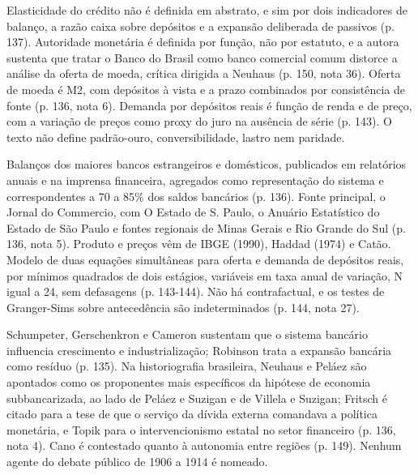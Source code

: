 


Elasticidade do crédito não é definida em abstrato, e sim por dois indicadores de balanço, a razão caixa sobre depósitos e a expansão deliberada de passivos (p. 137). Autoridade monetária é definida por função, não por estatuto, e a autora sustenta que tratar o Banco do Brasil como banco comercial comum distorce a análise da oferta de moeda, crítica dirigida a Neuhaus (p. 150, nota 36). Oferta de moeda é M2, com depósitos à vista e a prazo combinados por consistência de fonte (p. 136, nota 6). Demanda por depósitos reais é função de renda e de preço, com a variação de preços como proxy do juro na ausência de série (p. 143). O texto não define padrão-ouro, conversibilidade, lastro nem paridade.


Balanços dos maiores bancos estrangeiros e domésticos, publicados em relatórios anuais e na imprensa financeira, agregados como representação do sistema e correspondentes a 70 a 85\% dos saldos bancários (p. 136). Fonte principal, o Jornal do Commercio, com O Estado de S. Paulo, o Anuário Estatístico do Estado de São Paulo e fontes regionais de Minas Gerais e Rio Grande do Sul (p. 136, nota 5). Produto e preços vêm de IBGE (1990), Haddad (1974) e Catão. Modelo de duas equações simultâneas para oferta e demanda de depósitos reais, por mínimos quadrados de dois estágios, variáveis em taxa anual de variação, N igual a 24, sem defasagens (p. 143-144). Não há contrafactual, e os testes de Granger-Sims sobre antecedência são indeterminados (p. 144, nota 27).


Schumpeter, Gerschenkron e Cameron sustentam que o sistema bancário influencia crescimento e industrialização; Robinson trata a expansão bancária como resíduo (p. 135). Na historiografia brasileira, Neuhaus e Peláez são apontados como os proponentes mais específicos da hipótese de economia subbancarizada, ao lado de Peláez e Suzigan e de Villela e Suzigan; Fritsch é citado para a tese de que o serviço da dívida externa comandava a política monetária, e Topik para o intervencionismo estatal no setor financeiro (p. 136, nota 4). Cano é contestado quanto à autonomia entre regiões (p. 149). Nenhum agente do debate público de 1906 a 1914 é nomeado.

